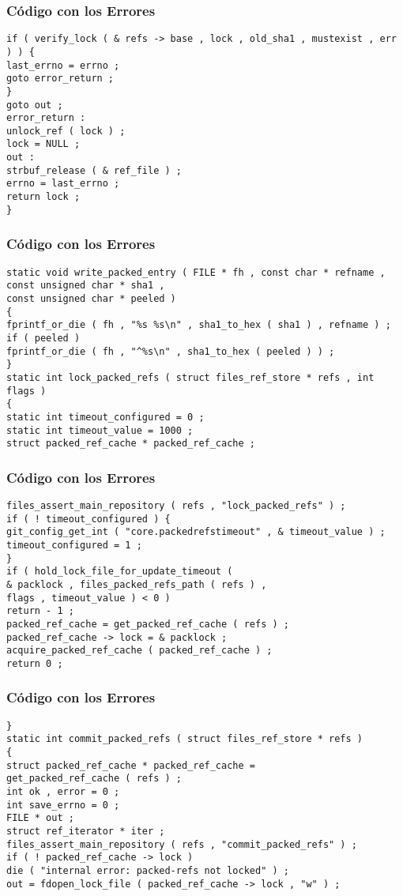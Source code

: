 \documentclass{beamer}
\begin{document}
\begin{frame}[fragile]
\frametitle{C\'odigo con los Errores}
\begin{verbatim}
if ( verify_lock ( & refs -> base , lock , old_sha1 , mustexist , err ) ) { 
last_errno = errno ; 
goto error_return ; 
} 
goto out ; 
error_return : 
unlock_ref ( lock ) ; 
lock = NULL ; 
out : 
strbuf_release ( & ref_file ) ; 
errno = last_errno ; 
return lock ; 
} 
\end{verbatim}
\end{frame}
\begin{frame}[fragile]
\frametitle{C\'odigo con los Errores}
\begin{verbatim}
static void write_packed_entry ( FILE * fh , const char * refname , 
const unsigned char * sha1 , 
const unsigned char * peeled ) 
{ 
fprintf_or_die ( fh , "%s %s\n" , sha1_to_hex ( sha1 ) , refname ) ; 
if ( peeled ) 
fprintf_or_die ( fh , "^%s\n" , sha1_to_hex ( peeled ) ) ; 
} 
static int lock_packed_refs ( struct files_ref_store * refs , int flags ) 
{ 
static int timeout_configured = 0 ; 
static int timeout_value = 1000 ; 
struct packed_ref_cache * packed_ref_cache ; 
\end{verbatim}
\end{frame}
\begin{frame}[fragile]
\frametitle{C\'odigo con los Errores}
\begin{verbatim}
files_assert_main_repository ( refs , "lock_packed_refs" ) ; 
if ( ! timeout_configured ) { 
git_config_get_int ( "core.packedrefstimeout" , & timeout_value ) ; 
timeout_configured = 1 ; 
} 
if ( hold_lock_file_for_update_timeout ( 
& packlock , files_packed_refs_path ( refs ) , 
flags , timeout_value ) < 0 ) 
return - 1 ; 
packed_ref_cache = get_packed_ref_cache ( refs ) ; 
packed_ref_cache -> lock = & packlock ; 
acquire_packed_ref_cache ( packed_ref_cache ) ; 
return 0 ; 
\end{verbatim}
\end{frame}
\begin{frame}[fragile]
\frametitle{C\'odigo con los Errores}
\begin{verbatim}
} 
static int commit_packed_refs ( struct files_ref_store * refs ) 
{ 
struct packed_ref_cache * packed_ref_cache = 
get_packed_ref_cache ( refs ) ; 
int ok , error = 0 ; 
int save_errno = 0 ; 
FILE * out ; 
struct ref_iterator * iter ; 
files_assert_main_repository ( refs , "commit_packed_refs" ) ; 
if ( ! packed_ref_cache -> lock ) 
die ( "internal error: packed-refs not locked" ) ; 
out = fdopen_lock_file ( packed_ref_cache -> lock , "w" ) ; 
\end{verbatim}
\end{frame}
\end{document}
